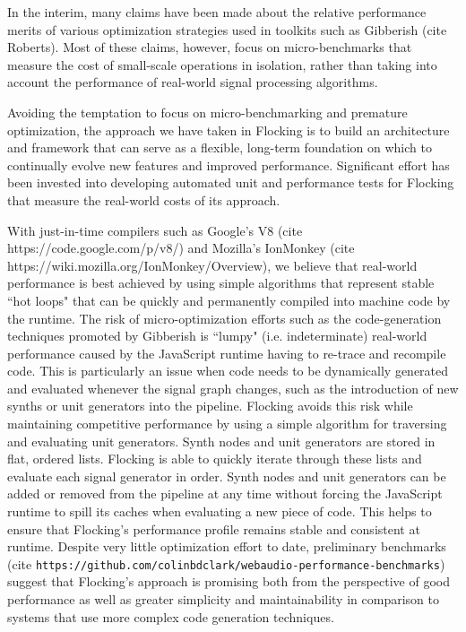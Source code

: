 \documentclass{article}
\begin{document}
In the interim, many claims have been made about the relative performance merits of various optimization strategies used in toolkits such as Gibberish (cite Roberts). Most of these claims, however, focus on micro-benchmarks that measure the cost of small-scale operations in isolation, rather than taking into account the performance of real-world signal processing algorithms.

Avoiding the temptation to focus on micro-benchmarking and premature optimization, the approach we have taken in Flocking is to build an architecture and framework that can serve as a flexible, long-term foundation on which to continually evolve new features and improved performance. Significant effort has been invested into developing automated unit and performance tests for Flocking that measure the real-world costs of its approach.

With just-in-time compilers such as Google's V8 (cite https://code.google.com/p/v8/) and Mozilla's IonMonkey (cite https://wiki.mozilla.org/IonMonkey/Overview), we believe that real-world performance is best achieved by using simple algorithms that represent stable ``hot loops" that can be quickly and permanently  compiled into machine code by the runtime. The risk of micro-optimization efforts such as the code-generation techniques promoted by Gibberish is ``lumpy" (i.e. indeterminate) real-world performance caused by the JavaScript runtime having to re-trace and recompile code. This is particularly an issue when code needs to be dynamically generated and evaluated whenever the signal graph changes, such as the introduction of new synths or unit generators into the pipeline. Flocking avoids this risk while maintaining competitive performance by using a simple algorithm for traversing and evaluating unit generators. Synth nodes and unit generators are stored in flat, ordered lists. Flocking is able to quickly iterate through these lists and evaluate each signal generator in order. Synth nodes and unit generators can be added or removed from the pipeline at any time without forcing the JavaScript runtime to spill its caches when evaluating a new piece of code. This helps to ensure that Flocking's performance profile remains stable and consistent at runtime. Despite very little optimization effort to date, preliminary benchmarks (cite \verb|https://github.com/colinbdclark/webaudio-performance-benchmarks|) suggest that Flocking's approach is promising both from the perspective of good performance as well as greater simplicity and maintainability in comparison to systems that use more complex code generation techniques.
\end{document}
